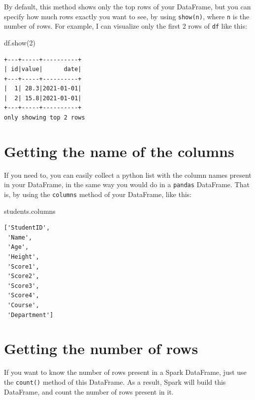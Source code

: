 \documentclass[
  11pt,
  letterpaper,
  DIV=11,
  numbers=noendperiod]{scrreprt}
\newenvironment{Shaded}{\begin{snugshade}}{\end{snugshade}}
\newcommand{\DecValTok}[1]{\textcolor[rgb]{0.68,0.00,0.00}{#1}}
\newcommand{\NormalTok}[1]{\textcolor[rgb]{0.00,0.23,0.31}{#1}}
\begin{document}
By default, this method shows only the top rows of your DataFrame, but
you can specify how much rows exactly you want to see, by using
\texttt{show(n)}, where \texttt{n} is the number of rows. For example, I
can visualize only the first 2 rows of \texttt{df} like this:

\begin{Shaded}
\begin{Highlighting}[]
\NormalTok{df.show(}\DecValTok{2}\NormalTok{)}
\end{Highlighting}
\end{Shaded}

\begin{verbatim}
+---+-----+----------+
| id|value|      date|
+---+-----+----------+
|  1| 28.3|2021-01-01|
|  2| 15.8|2021-01-01|
+---+-----+----------+
only showing top 2 rows
\end{verbatim}

\hypertarget{getting-the-name-of-the-columns}{%
\section{Getting the name of the
columns}\label{getting-the-name-of-the-columns}}

If you need to, you can easily collect a python list with the column
names present in your DataFrame, in the same way you would do in a
\texttt{pandas} DataFrame. That is, by using the \texttt{columns} method
of your DataFrame, like this:

\begin{Shaded}
\begin{Highlighting}[]
\NormalTok{students.columns}
\end{Highlighting}
\end{Shaded}

\begin{verbatim}
['StudentID',
 'Name',
 'Age',
 'Height',
 'Score1',
 'Score2',
 'Score3',
 'Score4',
 'Course',
 'Department']
\end{verbatim}

\hypertarget{getting-the-number-of-rows}{%
\section{Getting the number of rows}\label{getting-the-number-of-rows}}

If you want to know the number of rows present in a Spark DataFrame,
just use the \texttt{count()} method of this DataFrame. As a result,
Spark will build this DataFrame, and count the number of rows present in
it.
\end{document}
